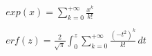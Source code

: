 \documentclass[preview]{standalone}
\begin{document}
\begin{align*}
exp(x) = \sum_{k=0}^{+\infty} { \frac{x^k}{k!} }\\ \\ erf(z) = { \frac{2}{\sqrt{\pi}} } \int_0^z { \sum_{k=0}^{+\infty} { \frac{(-t^2)^k}{k!} } } \, dt
\end{align*}
\end{document}
